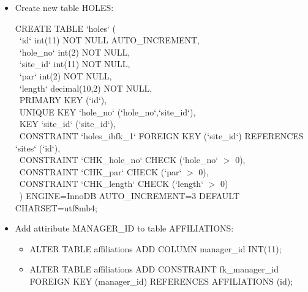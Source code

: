 \documentclass[titlepage]{article}
\begin{document}
\begin{itemize}
\vspace{1em}

\item Create new table HOLES: \vspace{1em}

\hspace{15pt}CREATE TABLE `holes` ( \\
\-\ \hspace{30pt}`id` int(11) NOT NULL AUTO\_INCREMENT, \\
\-\ \hspace{30pt}`hole\_no` int(2) NOT NULL, \\
\-\ \hspace{30pt}`site\_id` int(11) NOT NULL, \\
\-\ \hspace{30pt}`par` int(2) NOT NULL, \\
\-\ \hspace{30pt}`length` decimal(10,2) NOT NULL, \\
\-\ \hspace{30pt}PRIMARY KEY (`id`), \\
\-\ \hspace{30pt}UNIQUE KEY `hole\_no` (`hole\_no`,`site\_id`), \\
\-\ \hspace{30pt}KEY `site\_id` (`site\_id`), \\
\-\ \hspace{30pt}CONSTRAINT `holes\_ibfk\_1` FOREIGN KEY (`site\_id`) REFERENCES `sites` (`id`), \\
\-\ \hspace{30pt}CONSTRAINT `CHK\_hole\_no` CHECK (`hole\_no` $>$ 0), \\
\-\ \hspace{30pt}CONSTRAINT `CHK\_par` CHECK (`par` $>$ 0), \\
\-\ \hspace{30pt}CONSTRAINT `CHK\_length` CHECK (`length` $>$ 0) \\
\-\ \hspace{15pt}) ENGINE=InnoDB AUTO\_INCREMENT=3 DEFAULT CHARSET=utf8mb4; \\
\newpage

\vspace{1em}

\item Add attiribute MANAGER\_ID to table AFFILIATIONS: \vspace{1em}

\begin{itemize}
  \item ALTER TABLE affiliations ADD COLUMN manager\_id INT(11);
  \item ALTER TABLE affiliations ADD CONSTRAINT fk\_manager\_id \\ FOREIGN KEY (manager\_id) REFERENCES AFFILIATIONS (id);
\end{itemize}


\end{itemize}
\end{document}
